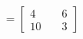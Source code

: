 \documentclass[preview]{standalone}
\begin{document}
\begin{align*}
=\begin{bmatrix} 4 & \quad 6 \\ 10 & \quad 3 \end{bmatrix}
\end{align*}
\end{document}
